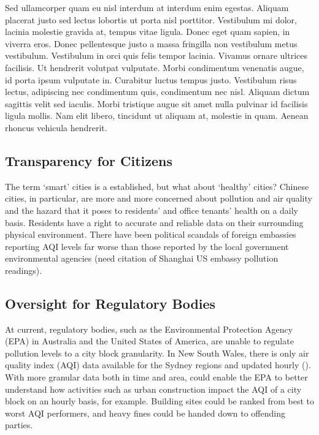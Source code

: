 Sed ullamcorper quam eu nisl interdum at interdum enim egestas. Aliquam placerat justo sed lectus lobortis ut porta nisl porttitor. Vestibulum mi dolor, lacinia molestie gravida at, tempus vitae ligula. Donec eget quam sapien, in viverra eros. Donec pellentesque justo a massa fringilla non vestibulum metus vestibulum. Vestibulum in orci quis felis tempor lacinia. Vivamus ornare ultrices facilisis. Ut hendrerit volutpat vulputate. Morbi condimentum venenatis augue, id porta ipsum vulputate in. Curabitur luctus tempus justo. Vestibulum risus lectus, adipiscing nec condimentum quis, condimentum nec nisl. Aliquam dictum sagittis velit sed iaculis. Morbi tristique augue sit amet nulla pulvinar id facilisis ligula mollis. Nam elit libero, tincidunt ut aliquam at, molestie in quam. Aenean rhoncus vehicula hendrerit.


\subsection{Transparency for Citizens}

The term ‘smart’ cities is a established, but what about ‘healthy’ cities? Chinese cities, in particular, are more and more concerned about pollution and air quality and the hazard that it poses to residents’ and office tenants’ health on a daily basis. Residents have a right to accurate and reliable data on their surrounding physical environment. There have been political scandals of foreign embassies reporting AQI levels far worse than those reported by the local government environmental agencies (need citation of Shanghai US embassy pollution readings).


\subsection{Oversight for Regulatory Bodies}

At current, regulatory bodies, such as the Environmental Protection Agency (EPA) in Australia and the United States of America, are unable to regulate pollution levels to a city block granularity. In New South Wales, there is only air quality index (AQI) data available for the Sydney regions and updated hourly (). With more granular data both in time and area, could enable the EPA to better understand how activities such as urban construction impact the AQI of a city block on an hourly basis, for example. Building sites could be ranked from best to worst AQI performers, and heavy fines could be handed down to offending parties.

